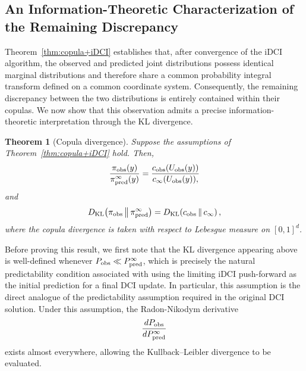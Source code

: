 \documentclass{article}
\newtheorem{theorem}{Theorem}[section]
\begin{document}
\subsection{An Information-Theoretic Characterization of the Remaining Discrepancy}

Theorem~\ref{thm:copula+iDCI} establishes that, after convergence of the iDCI algorithm, the observed and predicted joint distributions possess identical marginal distributions and therefore share a common probability integral transform defined on a common coordinate system.
Consequently, the remaining discrepancy between the two distributions is entirely contained within their copulas. We now show that this observation admits a precise information-theoretic interpretation through the KL divergence.

\begin{theorem}[Copula divergence]\label{thm:KL+copula+iDCI}
Suppose the assumptions of Theorem~\ref{thm:copula+iDCI} hold.
Then,
\begin{equation}\label{eq:iDCI_ratio_copula}
\frac{\pi_{\rm obs}(y)}
     {\pi_{\rm pred}^{\infty}(y)}
=
\frac{
c_{\rm obs}(U_{\rm obs}(y))
}{
c_{\infty}(U_{\rm obs}(y)),
}
\end{equation}
and
\begin{equation}
D_{\rm KL}
\!\left(
\pi_{\rm obs}
\,\middle\|\,
\pi_{\rm pred}^{\infty}
\right)
=
D_{\rm KL}
\!\left(
c_{\rm obs}
\,\middle\|\,
c_{\infty}
\right),
\label{eq:copula-kl}
\end{equation}
where the copula divergence is taken with respect to Lebesgue measure on $[0,1]^d$.
\end{theorem}

Before proving this result, we first note that the KL divergence appearing above is well-defined whenever $P_{\rm obs}
\ll
P_{\rm pred}^{\infty}$,
which is precisely the natural predictability condition associated with using the limiting iDCI push-forward as the initial prediction for a final DCI update.
In particular, this assumption is the direct analogue of the predictability assumption required in the original DCI solution.
Under this assumption, the Radon-Nikodym derivative
\[
\frac{dP_{\rm obs}}
     {dP_{\rm pred}^{\infty}}
\]
exists almost everywhere, allowing the Kullback--Leibler divergence to be evaluated.
\end{document}
